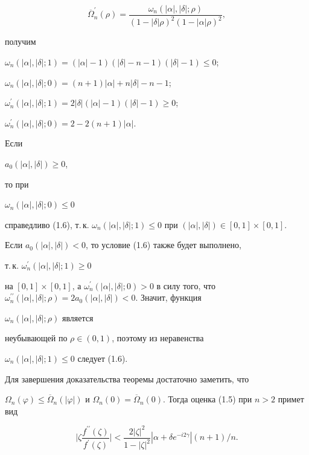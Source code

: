$$


\overline\Omega_n^\prime(\rho)=\frac{\omega_n(|\alpha|,


|\delta|;\rho)}{(1-|\delta|\rho)^2(1-|\alpha|\rho)^2},


$$


получим


$\omega_n(|\alpha|,|\delta|;1)=


(|\alpha|-1)(|\delta|-n-1)(|\delta|-1)\le 0$;


$\omega_n(|\alpha|,|\delta|;0)=(n+1)|\alpha


|+n|\delta|-n-1$;


$\omega_n^\prime(|\alpha|,|\delta|;1)=


2|\delta|(|\alpha|-1)(|\delta|-1)\ge 0$;


$\omega_n^\prime(|\alpha|,|\delta|;0)=2-2(n+1)|\alpha|$.


Если


$a_0(|\alpha|,|\delta|)\ge 0$,


то при


$\omega_n(|\alpha|,|\delta|;0)\le 0


$


справедливо (1.6), т.\,к. $\omega_n(|\alpha|,|\delta|;1)


\le 0$ при $(|\alpha|,|\delta|)\in[0,1]\times[0,1]$.


Если $a_0(|\alpha|,|\delta|)<0$, то условие (1.6) также будет выполнено,


т.\,к. $\omega_n^\prime(|\alpha|,|\delta|;1)\ge 0$


на $[0,1]\times[0,1]$, а $\omega_n^\prime(|\alpha|,


|\delta|;0)>0$ в силу того, что $\omega_n^{\prime\prime}


(|\alpha|,|\delta|;\rho)=2a_0(|\alpha|,|\delta|)<0$. Значит, функция


$\omega_n(|\alpha|,|\delta|;\rho)$ является


неубывающей по $\rho\in(0,1)$, поэтому из неравенства


$\omega_n(|\alpha|,|\delta|;1)\le 0$ следует (1.6).





Для завершения доказательства теоремы достаточно заметить, что


$\Omega_n(\varphi)\le\overline\Omega_n(|\varphi|)$ и $\Omega_n(0)=


\overline\Omega_n(0)$. Тогда оценка (1.5) при $n>2$ примет вид


\begin{equation}


\bigg|\zeta\frac{f^{\prime\prime}( \zeta)}{f^\prime( \zeta)}


\bigg|<\frac{2{|\zeta|}^2}{1-{| \zeta |}^2}|\alpha+\delta


e^{-i2\gamma}|(n+1)/n. 


\end{equation}



